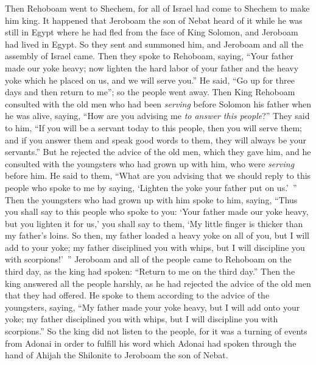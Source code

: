 \begin{biblechapter} %
 Then Rehoboam went to Shechem, for all of Israel had come to Shechem to make him king.
\verse It happened that Jeroboam the son of Nebat heard of it while he was still in Egypt where he had fled from the face of King Solomon, and Jeroboam had lived in Egypt.
\verse So they sent and summoned him, and Jeroboam and all the assembly of Israel came. Then they spoke to Rehoboam, saying,
\verse “Your father made our yoke heavy; now lighten the hard labor of your father and the heavy yoke which he placed on us, and we will serve you.”
\verse He said, “Go up for three days and then return to me”; so the people went away.
 Then King Rehoboam consulted with the old men who had been \textit{serving} before Solomon his father when he was alive, saying, “How are you advising me \textit{to answer this people}?”
\verse They said to him, “If you will be a servant today to this people, then you will serve them; and if you answer them and speak good words to them, they will always be your servants.”
\verse But he rejected the advice of the old men, which they gave him, and he consulted with the youngsters who had grown up with him, who were \textit{serving} before him.
\verse He said to them, “What are you advising that we should reply to this people who spoke to me by saying, ‘Lighten the yoke your father put on us.’ ”
\verse Then the youngsters who had grown up with him spoke to him, saying, “Thus you shall say to this people who spoke to you: ‘Your father made our yoke heavy, but you lighten it for us,’ you shall say to them, ‘My little finger is thicker than my father’s loins.
\verse So then, my father loaded a heavy yoke on all of you, but I will add to your yoke; my father disciplined you with whips, but I will discipline you with scorpions!’ ”
 Jeroboam and all of the people came to Rehoboam on the third day, as the king had spoken: “Return to me on the third day.”
\verse Then the king answered all the people harshly, as he had rejected the advice of the old men that they had offered.
\verse He spoke to them according to the advice of the youngsters, saying, “My father made your yoke heavy, but I will add onto your yoke; my father disciplined you with whips, but I will discipline you with scorpions.”
\verse So the king did not listen to the people, for it was a turning of events from Adonai in order to fulfill his word which Adonai had spoken through the hand of Ahijah the Shilonite to Jeroboam the son of Nebat.

\end{biblechapter}
